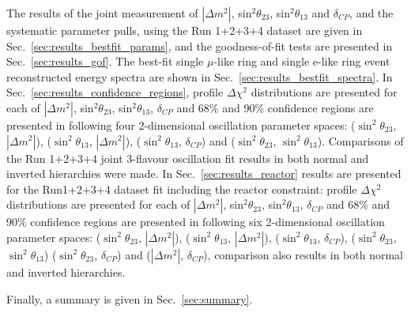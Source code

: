 The results of the joint measurement of $|\Delta m^{2}|$, sin$^{2}\theta_{23}$, sin$^{2}\theta_{13}$ and
$\delta_{CP}$, and the systematic parameter pulls, using the Run 1+2+3+4 dataset are given in Sec.\ \ref{sec:results_bestfit_params}, 
and the goodness-of-fit tests are presented in Sec.\ \ref{sec:results_gof}.
The best-fit single $\mu$-like ring and single e-like ring event reconstructed energy spectra 
are shown in Sec.\ \ref{sec:results_bestfit_spectra}.
In Sec.\ \ref{sec:results_confidence_regions}, profile $\Delta\chi^{2}$ distributions are presented 
for each of $|\Delta m^{2}|$, sin$^{2}\theta_{23}$, sin$^{2}\theta_{13}$, $\delta_{CP}$
and 68\% and 90\% confidence regions are presented in
following four 2-dimensional oscillation parameter spaces:
($\sin^{2}\theta_{23}$, $|\Delta m^{2}|$),
($\sin^{2}\theta_{13}$, $|\Delta m^{2}|$),
($\sin^{2}\theta_{13}$, $\delta_{CP}$) and
($\sin^{2}\theta_{23}$, $\sin^{2}\theta_{13}$).
Comparisons of the Run 1+2+3+4 joint 3-flavour oscillation fit results in both normal and inverted hierarchies were made. 
In Sec.\ \ref{sec:results_reactor} results are presented for the Run1+2+3+4 dataset fit including the reactor constraint: 
profile $\Delta\chi^{2}$ distributions are presented 
for each of $|\Delta m^{2}|$, sin$^{2}\theta_{23}$, sin$^{2}\theta_{13}$, $\delta_{CP}$
and 68\% and 90\% confidence regions are presented in
following six 2-dimensional oscillation parameter spaces:
($\sin^{2}\theta_{23}$, $|\Delta m^{2}|$),
($\sin^{2}\theta_{13}$, $|\Delta m^{2}|$),
($\sin^{2}\theta_{13}$, $\delta_{CP}$),
($\sin^{2}\theta_{23}$, $\sin^{2}\theta_{13}$)
($\sin^{2}\theta_{23}$, $\delta_{CP}$) and 
($|\Delta m^{2}|$, $\delta_{CP}$),
comparison also results in both normal and inverted hierarchies.

Finally, a summary is given in Sec.\ \ref{sec:summary}.  




